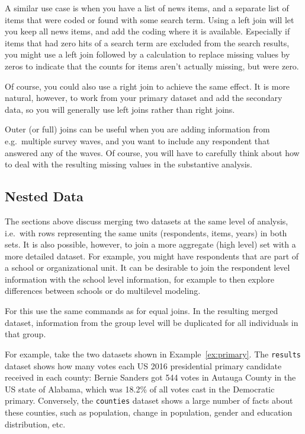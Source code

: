 A similar use case is when you have a list of news items, and a separate list of items that were coded
or found with some search term. Using a left join will let you keep all news items, and add the coding where it is available.
Especially if items that had zero hits of a search term are excluded from the search results,
you might use a left join followed by a calculation to replace missing values by zeros to indicate that the counts for
items aren't actually missing, but were zero.

Of course, you could also use a right join to achieve the same effect.
It is more natural, however, to work from your primary dataset and add the secondary data,
so you will generally use left joins rather than right joins.

Outer (or full) joins can be useful when you are adding information from e.g.\ multiple survey waves,
and you want to include any respondent that answered any of the waves.
Of course, you will have to carefully think about how to deal with the resulting missing values in the substantive analysis.

\subsection{Nested Data}

The sections above discuss merging two datasets at the same level of analysis,
i.e.\ with rows representing the same units (respondents, items, years) in both sets.
It is also possible, however, to join a more aggregate (high level) set with a more detailed dataset.
For example, you might have respondents that are part of a school or organizational unit.
It can be desirable to join the respondent level information with the school level information,
for example to then explore differences between schools or do multilevel modeling.

For this use the same commands as for equal joins.
In the resulting merged dataset, information from the group level will be duplicated for all individuals in that group.

For example, take the two datasets shown in Example~\ref{ex:primary}.
The \texttt{results} dataset shows how many votes each US 2016 presidential primary candidate received in each county:
Bernie Sanders got 544 votes in Autauga County in the US state of Alabama, which was 18.2\% of all votes cast in the
Democratic primary.
Conversely, the \texttt{counties} dataset shows a large number of facts about these counties,
such as population, change in population, gender and education distribution, etc.

